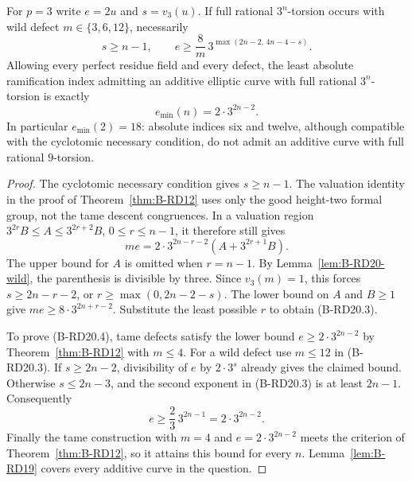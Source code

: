 \begin{proposition}
\label{prop:B-RD20}
For $p=3$ write $e=2u$ and $s=v_3(u)$. If full rational $3^n$-torsion
occurs with wild defect $m\in\{3,6,12\}$, necessarily
\[
 s\geq n-1,\qquad
 e\geq\frac8m\,3^{\max(2n-2,\,4n-4-s)}.        \tag{B-RD20.3}
\]
Allowing every perfect residue field and every defect, the least
absolute ramification index admitting an additive elliptic curve
with full rational $3^n$-torsion is exactly
\[
                            e_{\min}(n)=2\cdot3^{2n-2}.
                                                        \tag{B-RD20.4}
\]
In particular $e_{\min}(2)=18$: absolute indices six and twelve,
although compatible with the cyclotomic necessary condition,
do not admit an additive curve with full rational $9$-torsion.
\end{proposition}
\begin{proof}
The cyclotomic necessary condition gives $s\geq n-1$. The
valuation identity in the proof of Theorem~\ref{thm:B-RD12} uses
only the good height-two formal group, not the tame descent
congruences. In a valuation region
$3^{2r}B\leq A\leq3^{2r+2}B$, $0\leq r\leq n-1$, it therefore
still gives
\[
                  me=2\cdot3^{2n-r-2}(A+3^{2r+1}B).
                                                        \tag{B-RD20.5}
\]
The upper bound for $A$ is omitted when $r=n-1$.
By Lemma~\ref{lem:B-RD20-wild}, the parenthesis is divisible by
three. Since $v_3(m)=1$, this forces
$s\geq2n-r-2$, or $r\geq\max(0,2n-2-s)$.
The lower bound on $A$ and $B\geq1$ give
$me\geq8\cdot3^{2n+r-2}$. Substitute the least possible $r$ to
obtain (B-RD20.3).

To prove (B-RD20.4), tame defects satisfy the lower bound
$e\geq2\cdot3^{2n-2}$ by Theorem~\ref{thm:B-RD12} with $m\leq4$.
For a wild defect use $m\leq12$ in (B-RD20.3). If
$s\geq2n-2$, divisibility of $e$ by $2\cdot3^s$ already gives
the claimed bound. Otherwise $s\leq2n-3$, and the second exponent
in (B-RD20.3) is at least $2n-1$. Consequently
\[
 e\geq\frac23\,3^{2n-1}=2\cdot3^{2n-2}.
\]
Finally the tame construction with $m=4$ and
$e=2\cdot3^{2n-2}$ meets the criterion of
Theorem~\ref{thm:B-RD12}, so it attains this bound for every $n$.
Lemma~\ref{lem:B-RD19} covers every additive curve in the question.
\end{proof}

